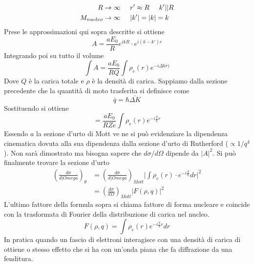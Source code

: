 \begin{equation}
\begin{split}
R\to\infty &\hspace{0.5cm}r'\approx R\hspace{0.5cm}k'||R\\
M_{nucleo}\to\infty &\hspace{0.5cm}|k'|=|k|=k
\end{split}
\end{equation}
Prese le approssimazioni qui sopra descritte si ottiene
\begin{equation}
A=\frac{aE_0}{R}e^{ikR}\cdot e^{i(k-k')r}
\end{equation}
Integrando poi su tutto il volume
\begin{equation}
\int A=\frac{aE_0}{RQ}\int \rho_e(r)e^{-i\Delta kr)}
\end{equation}
Dove $Q$ è la carica totale e $\rho$ è la densità di carica.
Sappiamo dalla sezione precedente che la quantità di moto trasferita si definisce come
\begin{equation}
\bar{q}=\hbar \bar{\Delta K}
\end{equation}
Sostituendo si ottiene
\begin{equation}
=\frac{aE_0}{RZe}\int \rho_e(r)e^{-i\frac{q}{\hbar}r}
\end{equation}
Essendo $a$ la sezione d'urto di Mott ve ne si può evidenziare la dipendenza cinematica dovuta alla sua dipendenza dalla sezione d'urto di Rutherford ($\propto 1/q^4$). 
Non sarà dimostrato ma bisogna sapere che $d\sigma/d\Omega$ dipende da $|A|^2$.
Si può finalmente trovare la sezione d'urto
\begin{equation}
\begin{split}
\left(\frac{d\sigma}{d|Omega}\right)_\theta &=\left(\frac{d\sigma}{d|Omega}\right)_{Mott}\biggl| \int\rho_e(r)\cdot e^{-i\frac{q}{\hbar}}dr\biggl|^2\\
&=\left(\frac{d\sigma}{d\Omega}\right)_{Mott}|F(\rho,q)|^2
\end{split}
\end{equation}
L'ultimo fattore della formula sopra si chiama fattore di forma nucleare e coincide con la trasformata di Fourier della distribuzione di carica nel nucleo.
\begin{equation}
F(\rho, q)=\int \rho_e(r)e^{-i\frac{q}{\hbar}r}dr
\end{equation}
In pratica quando un fascio di elettroni interagisce con una densità di carica di ottiene o stesso effetto che si ha con un'onda piana che fa diffrazione da una fenditura.

